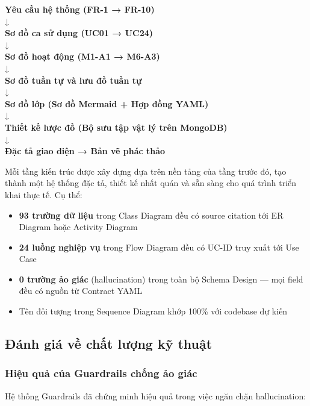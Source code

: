 \documentclass[13pt,a4paper,oneside]{extreport}
\numberwithin{equation}{chapter}
\numberwithin{figure}{chapter}
\numberwithin{table}{chapter}
\begin{document}
\begin{center}
\textbf{Yêu cầu hệ thống (FR-1 → FR-10)} \\
↓ \\
\textbf{Sơ đồ ca sử dụng (UC01 → UC24)} \\
↓ \\
\textbf{Sơ đồ hoạt động (M1-A1 → M6-A3)} \\
↓ \\
\textbf{Sơ đồ tuần tự và lưu đồ tuần tự} \\
↓ \\
\textbf{Sơ đồ lớp (Sơ đồ Mermaid + Hợp đồng YAML)} \\
↓ \\
\textbf{Thiết kế lược đồ (Bộ sưu tập vật lý trên MongoDB)} \\
↓ \\
\textbf{Đặc tả giao diện → Bản vẽ phác thảo}
\end{center}

Mỗi tầng kiến trúc được xây dựng dựa trên nền tảng của tầng trước đó, tạo thành một hệ thống đặc tả, thiết kế nhất quán và sẵn sàng cho quá trình triển khai thực tế. Cụ thể:

\begin{itemize}
    \item \textbf{93 trường dữ liệu} trong Class Diagram đều có source citation tới ER Diagram hoặc Activity Diagram
    \item \textbf{24 luồng nghiệp vụ} trong Flow Diagram đều có UC-ID truy xuất tới Use Case
    \item \textbf{0 trường ảo giác} (hallucination) trong toàn bộ Schema Design — mọi field đều có nguồn từ Contract YAML
    \item Tên đối tượng trong Sequence Diagram khớp 100\% với codebase dự kiến
\end{itemize}

\subsection{Đánh giá về chất lượng kỹ thuật}

\subsubsection{Hiệu quả của Guardrails chống ảo giác}

Hệ thống Guardrails đã chứng minh hiệu quả trong việc ngăn chặn hallucination:
\end{document}
